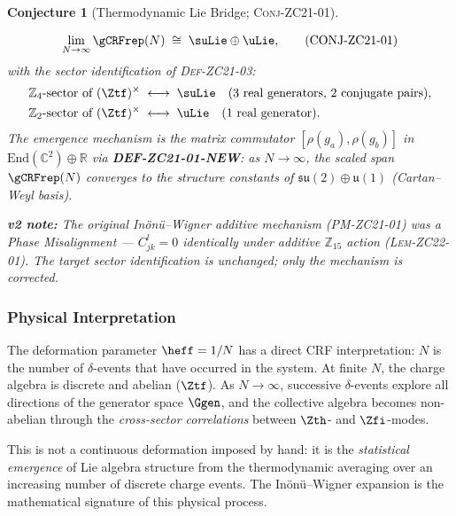 \documentclass[12pt, a4paper]{article}
\newtheorem{conjecture}{Conjecture}[section]
\begin{document}
\begin{conjecture}[Thermodynamic Lie Bridge; \textsc{Conj-ZC21-01}]
\label{zc21:conj:main}
\begin{derivedbox}[title={CONJ-ZC21-01 (Candidate) --- mechanism updated v2}]
\begin{equation}
  \lim_{N\to\infty} \gCRFrep(N) \;\cong\; \suLie \oplus \uLie,
  \tag{CONJ-ZC21-01}
\end{equation}
with the sector identification of \textsc{Def-ZC21-03}:
\begin{align*}
  \mathbb{Z}_4\text{-sector of }(\Ztf)^\times
    &\;\longleftrightarrow\; \suLie
    \quad (3 \text{ real generators, } 2 \text{ conjugate pairs}),\\
  \mathbb{Z}_2\text{-sector of }(\Ztf)^\times
    &\;\longleftrightarrow\; \uLie
    \quad (1 \text{ real generator}).
\end{align*}
The emergence mechanism is the matrix commutator
$[\rho(g_a),\rho(g_b)]$ in $\mathrm{End}(\mathbb{C}^2)\oplus\mathbb{R}$
via \textbf{DEF-ZC21-01-NEW}: as $N\to\infty$, the scaled span
$\gCRFrep(N)$ converges to the structure constants of
$\mathfrak{su}(2)\oplus\mathfrak{u}(1)$ (Cartan--Weyl basis).

\smallskip
\noindent\textbf{v2 note:} The original Inönü--Wigner additive mechanism
(\textsc{PM-ZC21-01}) was a Phase Misalignment — $C_{jk}^l = 0$ identically
under additive $\mathbb{Z}_{15}$ action (\textsc{Lem-ZC22-01}).
The target sector identification is unchanged; only the mechanism is corrected.
\end{derivedbox}
\end{conjecture}

\subsubsection{Physical Interpretation}

The deformation parameter $\heff = 1/N$ has a direct CRF interpretation:
$N$ is the number of $\delta$-events that have occurred in the system.
At finite $N$, the charge algebra is discrete and abelian ($\Ztf$).
As $N\to\infty$, successive $\delta$-events explore all directions
of the generator space $\Ggen$, and the collective algebra becomes
non-abelian through the \emph{cross-sector correlations} between
$\Zth$- and $\Zfi$-modes.

This is not a continuous deformation imposed by hand:
it is the \emph{statistical emergence} of Lie algebra structure
from the thermodynamic averaging over an increasing number of
discrete charge events.
The Inönü--Wigner expansion is the mathematical signature of this
physical process.
\end{document}

